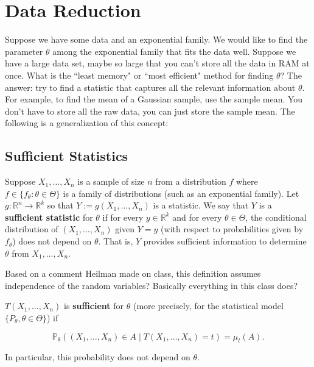 \section{Data Reduction}

Suppose we have some data and an exponential family. We would like to find the parameter \(\theta\) among the exponential family that fits the data well. Suppose we have a large data set, maybe so large that you can't store all the data in RAM at once. What is the ``least memory" or ``most efficient" method for finding \(\theta\)? The answer: try to find a statistic that captures all the relevant information about \(\theta\). For example, to find the mean of a Gaussian sample, use the sample mean. You don't have to store all the raw data, you can just store the sample mean. The following is a generalization of this concept:

\subsection{Sufficient Statistics}

\begin{definition} Suppose \(X_1, \ldots, X_n\) is a sample of size \(n\) from a distribution \(f\) where \(f \in \{f_\theta: \theta \in \Theta \}\) is a family of distributions (such as an exponential family). Let \(g: \mathbb{R}^n \to \mathbb{R}^k\) so that \(Y:= g(X_1, \ldots, X_n) \) is a statistic. We say that \(Y\) is a \textbf{sufficient statistic} for \(\theta\) if for every \(y \in \mathbb{R}^k\) and for every \(\theta \in \Theta\), the conditional distribution of \((X_1, \ldots, X_n)\) given \(Y=y\) (with respect to probabilities given by \(f_\theta\)) does not depend on \(\theta\). That is, \(Y\) provides sufficient information to determine \(\theta\) from \(X_1, \ldots, X_n\).

\end{definition}

\begin{remark} Based on a comment Heilman made on class, this definition assumes independence of the random variables? Basically everything in this class does?

\end{remark}

\begin{definition} \(T(X_1, \ldots, X_n)\) is \textbf{sufficient} for \(\theta\) (more precisely, for the statistical model \(\{P_\theta, \theta \in \Theta\}\)) if 

\[
\mathbb{P}_\theta( (X_1, \ldots, X_n)  \in A \mid T(X_1, \ldots, X_n) = t) = \mu_t(A).
\]

In particular, this probability does not depend on \(\theta\).

\end{definition}

